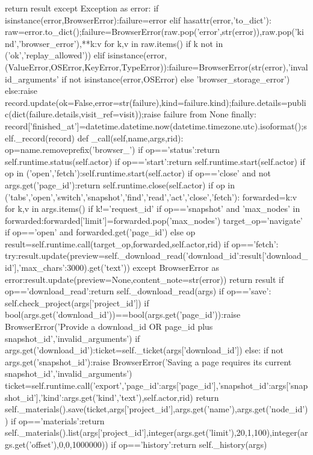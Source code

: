    return result
  except Exception as error:
   if isinstance(error,BrowserError):failure=error
   elif hasattr(error,'to_dict'):
    raw=error.to_dict();failure=BrowserError(raw.pop('error',str(error)),raw.pop('kind','browser_error'),**{k:v for k,v in raw.items() if k not in ('ok','replay_allowed')})
   elif isinstance(error,(ValueError,OSError,KeyError,TypeError)):failure=BrowserError(str(error),'invalid_arguments' if not isinstance(error,OSError) else 'browser_storage_error')
   else:raise
   record.update(ok=False,error=str(failure),kind=failure.kind);failure.details=public(dict(failure.details,visit_ref=visit));raise failure from None
  finally:
   record['finished_at']=datetime.datetime.now(datetime.timezone.utc).isoformat();self._record(record)
 def _call(self,name,args,rid):
  op=name.removeprefix('browser_')
  if op=='status':return self.runtime.status(self.actor)
  if op=='start':return self.runtime.start(self.actor)
  if op in ('open','fetch'):self.runtime.start(self.actor)
  if op=='close' and not args.get('page_id'):return self.runtime.close(self.actor)
  if op in ('tabs','open','switch','snapshot','find','read','act','close','fetch'):
   forwarded={k:v for k,v in args.items() if k!='request_id'}
   if op=='snapshot' and 'max_nodes' in forwarded:forwarded['limit']=forwarded.pop('max_nodes')
   target_op='navigate' if op=='open' and forwarded.get('page_id') else op
   result=self.runtime.call(target_op,forwarded,self.actor,rid)
   if op=='fetch':
    try:result.update(preview=self._download_read({'download_id':result['download_id'],'max_chars':3000}).get('text'))
    except BrowserError as error:result.update(preview=None,content_note=str(error))
   return result
  if op=='download_read':return self._download_read(args)
  if op=='save':
   self.check_project(args['project_id'])
   if bool(args.get('download_id'))==bool(args.get('page_id')):raise BrowserError('Provide a download_id OR page_id plus snapshot_id','invalid_arguments')
   if args.get('download_id'):ticket=self._ticket(args['download_id'])
   else:
    if not args.get('snapshot_id'):raise BrowserError('Saving a page requires its current snapshot_id','invalid_arguments')
    ticket=self.runtime.call('export',{'page_id':args['page_id'],'snapshot_id':args['snapshot_id'],'kind':args.get('kind','text')},self.actor,rid)
   return self._materials().save(ticket,args['project_id'],args.get('name'),args.get('node_id'))
  if op=='materials':return self._materials().list(args['project_id'],integer(args.get('limit'),20,1,100),integer(args.get('offset'),0,0,1000000))
  if op=='history':return self._history(args)
